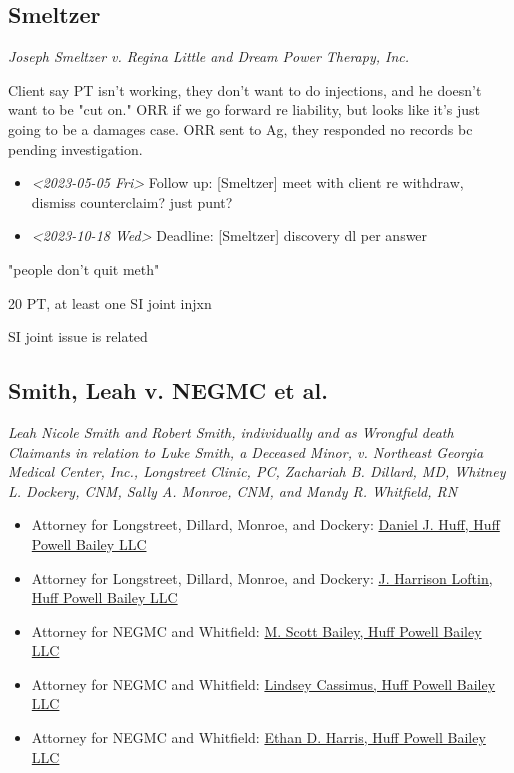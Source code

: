 \documentclass[11pt]{article}
\begin{document}
\subsection*{Smeltzer}
\label{sec:org8579fe3}

\emph{Joseph Smeltzer v. Regina Little and Dream Power Therapy, Inc.}

Client say PT isn't working, they don't want to do injections, and he doesn't want to be "cut on."  ORR if we go forward re liability, but looks like it's just going to be a damages case. ORR sent to Ag, they responded no records bc pending investigation.

\begin{itemize}
\item \textit{<2023-05-05 Fri> } Follow up: [Smeltzer] meet with client re withdraw, dismiss counterclaim? just punt?

\item \textit{<2023-10-18 Wed> } Deadline: [Smeltzer] discovery dl per answer
\end{itemize}

"people don't quit meth"

20 PT, at least one SI joint injxn

SI joint issue is related

\subsection*{Smith, Leah v. NEGMC et al.}
\label{sec:orga3820d3}

\emph{Leah Nicole Smith and Robert Smith, individually and as Wrongful death Claimants in relation to Luke Smith, a Deceased Minor, v. Northeast Georgia Medical Center, Inc., Longstreet Clinic, PC, Zachariah B. Dillard, MD, Whitney L. Dockery, CNM, Sally A. Monroe, CNM, and Mandy R. Whitfield, RN}

\begin{itemize}
\item Attorney for Longstreet, Dillard, Monroe, and Dockery: \href{https://gabar.reliaguide.com/lawyer/30309-GA-Daniel-Huff-283902}{Daniel J. Huff, Huff Powell Bailey LLC}

\item Attorney for Longstreet, Dillard, Monroe, and Dockery: \href{https://gabar.reliaguide.com/lawyer/30309-GA-John-Loftin-250170}{J. Harrison Loftin, Huff Powell Bailey LLC}

\item Attorney for NEGMC and Whitfield: \href{https://gabar.reliaguide.com/lawyer/30309-GA-Michael-Bailey-248155}{M. Scott Bailey, Huff Powell Bailey LLC}

\item Attorney for NEGMC and Whitfield: \href{https://gabar.reliaguide.com/lawyer/30309-GA-Lindsey-Costakos-279062}{Lindsey Cassimus, Huff Powell Bailey LLC}

\item Attorney for NEGMC and Whitfield: \href{https://gabar.reliaguide.com/lawyer/30309-GA-Ethan-Harris-250213}{Ethan D. Harris, Huff Powell Bailey LLC}
\end{itemize}
\end{document}
